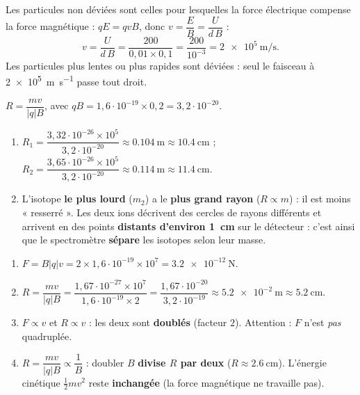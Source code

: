 \documentclass[11pt,a4paper]{article}
\begin{document}
\begin{corrige}
Les particules non déviées sont celles pour lesquelles la force électrique compense la force
magnétique : $qE=qvB$, donc $v=\dfrac{E}{B}=\dfrac{U}{d\,B}$ :
\[ v=\frac{U}{d\,B}=\frac{200}{0{,}01\times0{,}1}=\frac{200}{10^{-3}}=\qty{2e5}{\metre\per\second}. \]
Les particules plus lentes ou plus rapides sont déviées : seul le faisceau à \qty{2e5}{\metre\per\second} passe tout droit.
\end{corrige}

\begin{corrige}
$R=\dfrac{mv}{|q|B}$, avec $qB=1{,}6\cdot10^{-19}\times0{,}2=3{,}2\cdot10^{-20}$.
\begin{enumerate}[label=\alph*)]
  \item $R_1=\dfrac{3{,}32\cdot10^{-26}\times10^{5}}{3{,}2\cdot10^{-20}}\approx\qty{0.104}{\metre}\approx\qty{10.4}{\centi\metre}$ ;
        \quad $R_2=\dfrac{3{,}65\cdot10^{-26}\times10^{5}}{3{,}2\cdot10^{-20}}\approx\qty{0.114}{\metre}\approx\qty{11.4}{\centi\metre}$.
  \item L'isotope \textbf{le plus lourd} ($m_2$) a le \textbf{plus grand rayon} ($R\propto m$) : il est
        moins « resserré ». Les deux ions décrivent des cercles de rayons différents et arrivent en des
        points \textbf{distants d'environ \qty{1}{\centi\metre}} sur le détecteur : c'est ainsi que le
        spectromètre \textbf{sépare} les isotopes selon leur masse.
\end{enumerate}
\end{corrige}

\begin{corrige}
\begin{enumerate}[label=\alph*)]
  \item $F=B|q|v=2\times1{,}6\cdot10^{-19}\times10^{7}=\qty{3.2e-12}{\newton}.$
  \item $R=\dfrac{mv}{|q|B}=\dfrac{1{,}67\cdot10^{-27}\times10^{7}}{1{,}6\cdot10^{-19}\times2}
        =\dfrac{1{,}67\cdot10^{-20}}{3{,}2\cdot10^{-19}}\approx\qty{5.2e-2}{\metre}\approx\qty{5.2}{\centi\metre}.$
  \item $F\propto v$ et $R\propto v$ : les deux sont \textbf{doublés} (facteur $2$). Attention : $F$
        n'est \emph{pas} quadruplée.
  \item $R=\dfrac{mv}{|q|B}\propto\dfrac1B$ : doubler $B$ \textbf{divise $R$ par deux} ($R\approx\qty{2.6}{\centi\metre}$).
        L'énergie cinétique $\tfrac12 mv^2$ reste \textbf{inchangée} (la force magnétique ne travaille pas).
\end{enumerate}
\end{corrige}
\end{document}
